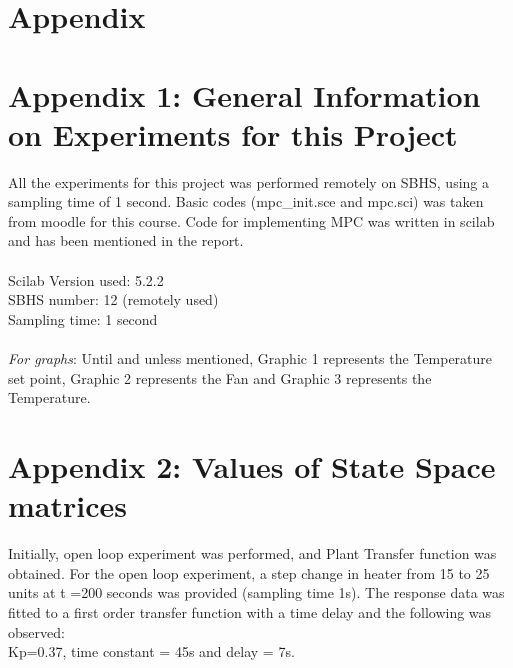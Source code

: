 \section{Appendix}
\section{Appendix 1: General Information on Experiments for this Project}
All the experiments for this project was performed remotely on SBHS, using a sampling time of 1 second. Basic codes (mpc\_init.sce and mpc.sci) was taken from moodle for this course. Code for implementing MPC was written in scilab and has been mentioned in the report. \\ \\
Scilab Version used: 5.2.2 \\
SBHS number: 12 (remotely used) \\
Sampling time: 1 second \\ \\
\emph{For graphs}: Until and unless mentioned, Graphic 1 represents the Temperature set point, Graphic 2 represents the Fan and Graphic 3 represents the Temperature.

\section{Appendix 2: Values of State Space matrices}
Initially, open loop experiment was performed, and Plant Transfer function was obtained. For the open loop experiment, a step change in heater from 15 to 25 units at t =200 seconds was provided (sampling time 1s). The response data was fitted to a first order transfer function with a time delay and the following was observed: \\
Kp=0.37, time constant = 45s and delay = 7s. \\ \\

